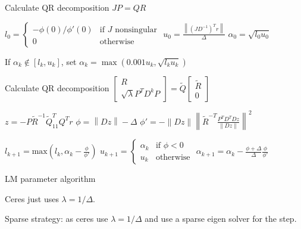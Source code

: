\begin{algorithm}
  \DontPrintSemicolon

  Calculate QR decomposition $J P = Q R$\;

  $l_{0} = \begin{cases} -\phi(0)/\phi'(0) & \text{if $J$ nonsingular} \\ 0 & \textrm{otherwise} \end{cases}$\;
  $u_{0} = \frac{\left\| (J D^{-1})^{T} r\right\|}{\Delta}$\;
  $\alpha_{0} = \sqrt{l_{0} u_{0}}$\;

  \Repeat{$|\phi| \leq 0.1 \Delta$} {
  If $\alpha_{k} \not \in [l_{k}, u_{k}]$, set $\alpha_{k} = \max\left(0.001 u_{k}, \sqrt{l_{k} u_{k}}\right)$\;

  Calculate QR decomposition $\begin{bmatrix} R \\ \sqrt{\lambda} P^{T} D^{k} P \end{bmatrix} = \tilde Q \begin{bmatrix} \tilde R \\ 0 \end{bmatrix}$\;

  $z = -P \tilde R^{-1} \tilde Q_{11}^{T} Q^{T} r$\;
  $\phi = \left\| D z \right\| - \Delta$\;
  $\phi' = - \| D z \| \left\| \tilde R^{-T} \frac{P^{T} D^{T} D z }{\| D z \|} \right\|^{2}$\;

  $l_{k+1} = \textrm{max}\left(l_{k}, \alpha_{k} - \frac{\phi}{\phi'}\right)$\;
  $u_{k+1} = \begin{cases} \alpha_{k} & \text{if $\phi < 0$} \\ u_{k} & \text{otherwise} \end{cases}$\;
  $\alpha_{k+1} = \alpha_{k} - \frac{\phi + \Delta}{\Delta} \frac{\phi}{\phi'}$\;
  }

  \caption{LM parameter algorithm}
  \label{algo:lm_parameter}
\end{algorithm}

\begin{remark}
  Ceres just uses $\lambda = 1 / \Delta$.

  Sparse strategy: as ceres use $\lambda = 1 / \Delta$ and use a sparse eigen solver for the step.
\end{remark}

